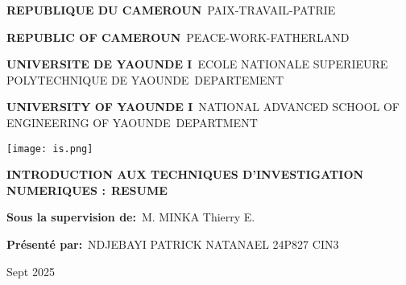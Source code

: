 \documentclass[a4paper,12pt]{extarticle}
\begin{document}
\begin{titlepage}
\thispagestyle{empty}
\begin{center}
\begin{minipage}{0.45\textwidth}
\begin{center}
\color{blue}\textbf{REPUBLIQUE DU CAMEROUN}\
\color{black}PAIX-TRAVAIL-PATRIE
\end{center}
\end{minipage}
\hfill
\begin{minipage}{0.45\textwidth}
\begin{center}
\color{blue}\textbf{REPUBLIC OF CAMEROUN}\
\color{black}PEACE-WORK-FATHERLAND
\end{center}
\end{minipage}
\end{center}
\vspace{1cm}
\begin{center}
\begin{minipage}{0.45\textwidth}
\begin{center}
\textbf{UNIVERSITE DE YAOUNDE I}\
ECOLE NATIONALE SUPERIEURE POLYTECHNIQUE DE YAOUNDE\
DEPARTEMENT
\end{center}
\end{minipage}
\hfill
\begin{minipage}{0.45\textwidth}
\begin{center}
\textbf{UNIVERSITY OF YAOUNDE I}\
NATIONAL ADVANCED SCHOOL OF ENGINEERING OF YAOUNDE\
DEPARTMENT
\end{center}
\end{minipage}
\end{center}
\vspace{2cm}
\begin{center}
\texttt{[image: is.png]}
\end{center}
\vspace{1cm}
\begin{center}
\Large \textbf{INTRODUCTION AUX TECHNIQUES D’INVESTIGATION NUMERIQUES :}\
\LARGE \textbf{RESUME}
\end{center}
\vspace{2cm}
\begin{center}
\textbf{Sous la supervision de:}\
M. MINKA Thierry E.
\end{center}
\vspace{1cm}
\begin{center}
\textbf{Présenté par:}\
NDJEBAYI PATRICK NATANAEL 24P827 CIN3
\end{center}
\vspace{1cm}
\begin{center}
Sept 2025
\end{center}
\vfill
\end{titlepage}
\end{document}

